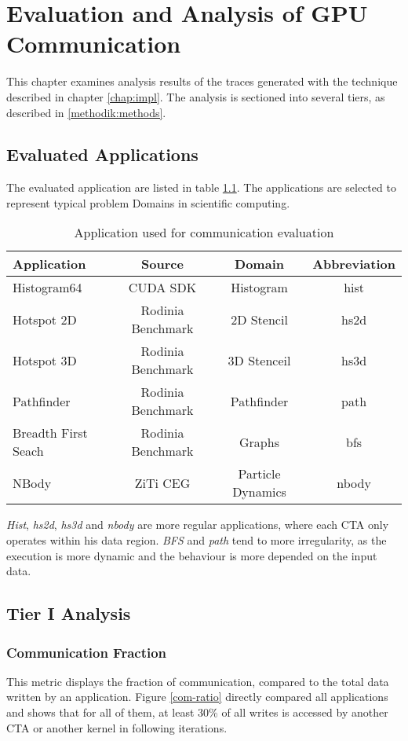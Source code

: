 \chapter{Evaluation and Analysis of GPU Communication}\label{eval}
This chapter examines analysis results of the traces generated with the technique described in chapter \ref{chap:impl}. The analysis is sectioned into several tiers, as described in \ref{methodik:methods}.\\


\section{Evaluated Applications}
The evaluated application are listed in table \ref{eval-apps}. The applications are selected to represent typical problem Domains in scientific computing. 
\begin{table}[h]
	\centering
\begin{tabular}{|l|c|c|c|}
	\hline 
	Application & Source & Domain & Abbreviation \\ 
	\hline 
	Histogram64 & CUDA SDK & Histogram & hist \\ 
	\hline 
	Hotspot 2D & Rodinia Benchmark & 2D Stencil & hs2d \\ 
	\hline 
	Hotspot 3D & Rodinia Benchmark & 3D Stenceil & hs3d \\ 
	\hline 
	Pathfinder & Rodinia Benchmark & Pathfinder & path \\ 
	\hline 
	Breadth First Seach & Rodinia Benchmark & Graphs & bfs \\ 
	\hline 
	NBody & ZiTi CEG & Particle Dynamics & nbody \\ 
	\hline 
\end{tabular} 
\caption{Application used for communication evaluation}
\label{eval-apps}
\end{table}
\textit{Hist}, \textit{hs2d}, \textit{hs3d} and \textit{nbody} are more regular applications, where each CTA only operates within his data region. \textit{BFS} and \textit{path} tend to more irregularity, as the execution is more dynamic and the behaviour is more depended on the input data. 
\section{Tier I Analysis}
\subsection{Communication Fraction}
This metric displays the fraction of communication, compared to the total data written by an application. Figure \ref{com-ratio} directly compared all applications and shows that for all of them, at least 30\% of all writes is accessed by another CTA or another kernel in following iterations.

